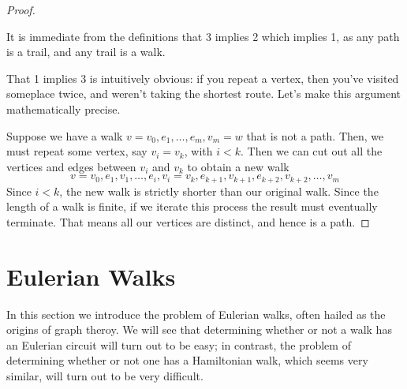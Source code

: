 \documentclass[10pt,]{book}
\theoremstyle{plain}
\theoremstyle{definition}
\theoremstyle{definition}
\theoremstyle{definition}
\theoremstyle{definition}
\numberwithin{equation}{section}
\newcommand{\lt}{<}
\begin{document}
\begin{proof}\hypertarget{proof-3}{}
\hypertarget{p-110}{}%
It is immediate from the definitions that 3 implies 2 which implies 1, as any path is a trail, and any trail is a walk.%
\par
\hypertarget{p-111}{}%
That 1 implies 3 is intuitively obvious: if you repeat a vertex, then you've visited someplace twice, and weren't taking the shortest route.  Let's make this argument mathematically precise.%
\par
\hypertarget{p-112}{}%
Suppose we have a walk \(v=v_0,e_1,\dots, e_m, v_m=w\) that is not a path.  Then, we must repeat some vertex, say \(v_i=v_k\), with \(i\lt k\).  Then we can cut out all the vertices and edges between \(v_i\) and \(v_k\) to obtain a new walk%
%
\begin{equation*}
v=v_0,e_1, v_1,\dots, e_i, v_i=v_k, e_{k+1}, v_{k+1}, e_{k+2}, v_{k+2}, \dots, v_m
\end{equation*}
\hypertarget{p-113}{}%
Since \(i \lt k \), the new walk is strictly shorter than our original walk.  Since the length of a walk is finite, if we iterate this process the result must eventually terminate.  That means all our vertices are distinct, and hence is a path.%
\end{proof}
\typeout{************************************************}
\typeout{************************************************}
\section[{Eulerian Walks}]{Eulerian Walks}\label{s_walks_eulerian}
\hypertarget{p-114}{}%
In this section we introduce the problem of Eulerian walks, often hailed as the origins of graph theroy. We will see that determining whether or not a walk has an Eulerian circuit will turn out to be easy; in contrast, the problem of determining whether or not one has a Hamiltonian walk, which seems very similar, will turn out to be very difficult.%
\typeout{************************************************}
\typeout{************************************************}
\end{document}
